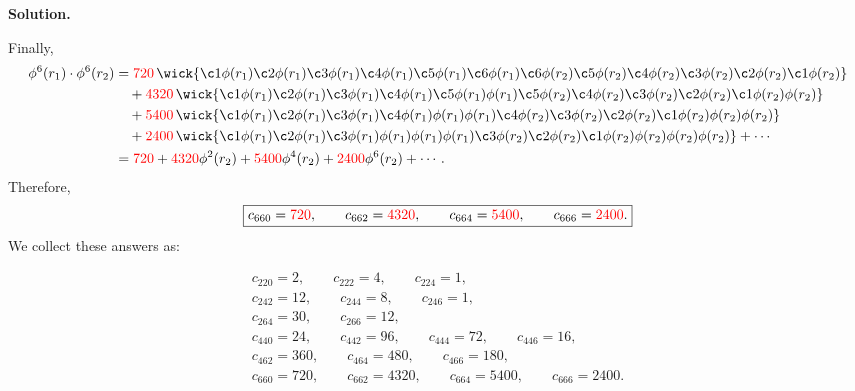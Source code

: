 \documentclass[11pt,a4paper]{article}
\newcounter{problem}
\newcounter{saveequation}
\newenvironment{solution}
{
	\par
	\setcounter{saveequation}{\value{equation}}
	\begingroup
	\setcounter{equation}{0}
	\renewcommand{\theequation}{\arabic{problem}.\arabic{equation}}
	\renewcommand{\theHequation}{sol.\arabic{problem}.\arabic{equation}}
	\noindent\textbf{Solution.}\quad
}
{
	\par
	\endgroup
	\setcounter{equation}{\value{saveequation}}
}
\begin{document}
\begin{solution}
		Finally,
		\begin{align}
			\phi^6(r_1)\cdot\phi^6(r_2)
			&=
			\textcolor{red}{720}\,
			\wick{
				\c1\phi(r_1)\c2\phi(r_1)\c3\phi(r_1)
				\c4\phi(r_1)\c5\phi(r_1)\c6\phi(r_1)
				\c6\phi(r_2)\c5\phi(r_2)\c4\phi(r_2)
				\c3\phi(r_2)\c2\phi(r_2)\c1\phi(r_2)
			}
			\notag\\
			&\quad
			+\textcolor{red}{4320}\,
			\wick{
				\c1\phi(r_1)\c2\phi(r_1)\c3\phi(r_1)
				\c4\phi(r_1)\c5\phi(r_1)\phi(r_1)
				\c5\phi(r_2)\c4\phi(r_2)\c3\phi(r_2)
				\c2\phi(r_2)\c1\phi(r_2)\phi(r_2)
			}
			\notag\\
			&\quad
			+\textcolor{red}{5400}\,
			\wick{
				\c1\phi(r_1)\c2\phi(r_1)\c3\phi(r_1)
				\c4\phi(r_1)\phi(r_1)\phi(r_1)
				\c4\phi(r_2)\c3\phi(r_2)\c2\phi(r_2)
				\c1\phi(r_2)\phi(r_2)\phi(r_2)
			}
			\notag\\
			&\quad
			+\textcolor{red}{2400}\,
			\wick{
				\c1\phi(r_1)\c2\phi(r_1)\c3\phi(r_1)
				\phi(r_1)\phi(r_1)\phi(r_1)
				\c3\phi(r_2)\c2\phi(r_2)\c1\phi(r_2)
				\phi(r_2)\phi(r_2)\phi(r_2)
			}
			+\cdots
			\notag\\
			&=
			\textcolor{red}{720}
			+\textcolor{red}{4320}\phi^2(r_2)
			+\textcolor{red}{5400}\phi^4(r_2)
			+\textcolor{red}{2400}\phi^6(r_2)
			+\cdots .
		\end{align}
		Therefore,
		\[
		\boxed{
			c_{660}=\textcolor{red}{720},
			\qquad
			c_{662}=\textcolor{red}{4320},
			\qquad
			c_{664}=\textcolor{red}{5400},
			\qquad
			c_{666}=\textcolor{red}{2400}.
		}
		\]
		We collect these answers as:
		\begin{finalanswer}
			\begin{equation}
			\label{fin:2}
			\begin{gathered}
				c_{220}=2,
				\qquad
				c_{222}=4,
				\qquad
				c_{224}=1,
				\\[0.5em]
				c_{242}=12,
				\qquad
				c_{244}=8,
				\qquad
				c_{246}=1,
				\\[0.5em]
				c_{264}=30,
				\qquad
				c_{266}=12,
				\\[0.5em]
				c_{440}=24,
				\qquad
				c_{442}=96,
				\qquad
				c_{444}=72,
				\qquad
				c_{446}=16,
				\\[0.5em]
				c_{462}=360,
				\qquad
				c_{464}=480,
				\qquad
				c_{466}=180,
				\\[0.5em]
				c_{660}=720,
				\qquad
				c_{662}=4320,
				\qquad
				c_{664}=5400,
				\qquad
				c_{666}=2400.
			\end{gathered}
			\end{equation}
		\end{finalanswer}
	\end{solution}
\end{document}
